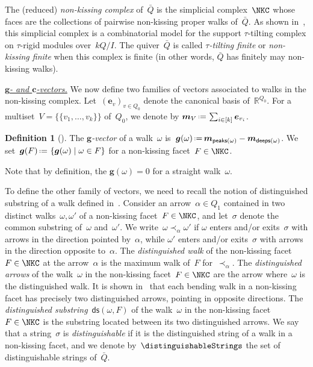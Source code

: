 \documentclass{amsart}
\theoremstyle{definition}
\newtheorem{definition}[theorem]{Definition}
\newcommand{\R}{\mathbb{R}} %
\renewcommand{\b}[1]{{\boldsymbol{#1}}} %
\newcommand{\set}[2]{\left\{ #1 \;\middle|\; #2 \right\}} %
\newcommand{\eqdef}{\mbox{\,\raisebox{0.2ex}{\scriptsize\ensuremath{\mathrm:}}\ensuremath{=}\,}} %
\newcommand{\darkblue}{\color{darkblue}} %
\newcommand{\defn}[1]{\textsl{\darkblue #1}} %
\newcommand{\para}[1]{\medskip\noindent\uline{\textit{#1.}}} %
\newcommand{\multiplicityVector}{\b{m}} %
\newcommand{\gvector}[1]{\b{g}(#1)} %
\newcommand{\gvectors}[1]{\b{g}(#1)} %
\newcommand{\quiver}{\bar Q} %
\newcommand{\peaks}[1]{\mathsf{peaks}(#1)} %
\newcommand{\deeps}[1]{\mathsf{deeps}(#1)} %
\newcommand{\distinguishedString}[2]{\mathsf{ds}(#1,#2)} %
\begin{document}
%
The (reduced) \defn{non-kissing complex} of~$\quiver$ is the simplicial complex~$\NKC$ whose faces are the collections of pairwise non-kissing proper walks of~$\quiver$.
As shown in~\cite[Thm.~2.46]{PaluPilaudPlamondon-nonkissing}, this simplicial complex is a combinatorial model for the support $\tau$-tilting complex on $\tau$-rigid modules over~$kQ/I$.
The quiver~$\quiver$ is called \defn{$\tau$-tilting finite} or \defn{non-kissing finite} when this complex is finite (in other words, $\quiver$ has finitely may non-kissing walks).

\para{$\b{g}$- and $\b{c}$-vectors}
%
We now define two families of vectors associated to walks in the non-kissing complex.
Let~$(\b{e}_v)_{v \in Q_0}$ denote the canonical basis of~$\R^{Q_0}$.
For a multiset~$V = \{\!\{v_1, \dots, v_k\}\!\}$ of~$Q_0$, we denote by $\multiplicityVector_V \eqdef \sum_{i \in [k]} \b{e}_{v_i}$.

\begin{definition}[{\cite[Def.~{4.8}]{PaluPilaudPlamondon-nonkissing}}]
The \defn{$\b{g}$-vector} of a walk~$\omega$ is~$\gvector{\omega} \eqdef \multiplicityVector_{\peaks{\omega}} - \multiplicityVector_{\deeps{\omega}}$.
We set~$\gvectors{F} \eqdef \set{\gvector{\omega}}{\omega \in F}$ for a non-kissing facet~$F \in \NKC$.
\end{definition}

Note that by definition, the $\gvector{\omega} = 0$ for a straight walk~$\omega$.

To define the other family of vectors, we need to recall the notion of distinguished substring of a walk defined in~\cite[Def.~2.25]{PaluPilaudPlamondon-nonkissing}.
Consider an arrow~$\alpha \in Q_1$ contained in two distinct walks~$\omega, \omega'$ of a non-kissing facet~$F \in \NKC$, and let~$\sigma$ denote the common substring of~$\omega$ and~$\omega'$.
We write~$\omega \prec_\alpha \omega'$ if $\omega$ enters and/or exits~$\sigma$ with arrows in the direction pointed by~$\alpha$, while $\omega'$ enters and/or exits~$\sigma$ with arrows in the direction opposite to~$\alpha$.
The \defn{distinguished walk} of the non-kissing facet~$F \in \NKC$ at the arrow~$\alpha$ is the maximum walk of~$F$ for~$\prec_\alpha$.
The \defn{distinguished arrows} of the walk~$\omega$ in the non-kissing facet~$F \in \NKC$ are the arrow where~$\omega$ is the distinguished walk.
It is shown in~\cite[Prop.~2.28]{PaluPilaudPlamondon-nonkissing} that each bending walk in a non-kissing facet has precisely two distinguished arrows, pointing in opposite directions.
The \defn{distinguished substring}~$\distinguishedString{\omega}{F}$ of the walk~$\omega$ in the non-kissing facet~$F \in \NKC$ is the substring located between its two distinguished arrows.
We say that a string~$\sigma$ is \defn{distinguishable} if it is the distinguished string of a walk in a non-kissing facet, and we denote by~$\distinguishableStrings$ the set of distinguishable strings of~$\quiver$.
\end{document}
